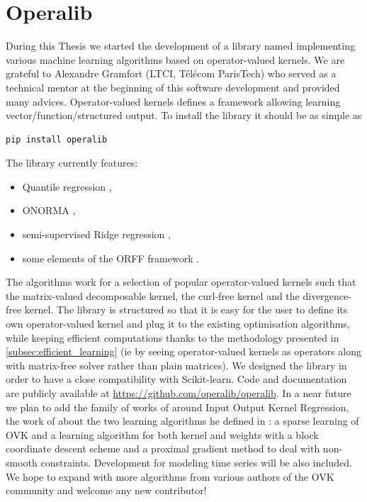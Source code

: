 \section{Operalib}
During this Thesis we started the development of a library named 
implementing various machine learning algorithms based on operator-valued
kernels. We are grateful to Alexandre Gramfort (LTCI, T\'el\'ecom ParisTech)
who served as a technical mentor at the beginning of this software development
and provided many advices.  Operator-valued kernels defines a framework
allowing learning vector/function/structured output. 
To install the library it should be as simple as
\begin{lstlisting}[language=bash,caption={Installation of Operalib.}]
pip install operalib
\end{lstlisting}
The library currently features:
\begin{itemize}
    \item Quantile regression \citep{sangnier2016joint},
    \item \acs{ONORMA} \citep{audiffren2013online},
    \item semi-supervised Ridge regression \citep{Brouard2016_jmlr},
    \item some elements of the \acs{ORFF} framework \citep{brault2016random}.
\end{itemize}
The algorithms work for a selection of popular operator-valued kernels such
that the matrix-valued decomposable kernel, the curl-free kernel and the
divergence-free kernel. The library is structured so that it is easy for the
user to define its own operator-valued kernel and plug it to the existing
optimisation algorithms, while keeping efficient computations thanks to the
methodology presented in \cref{subsec:efficient_learning} (\acs{ie} by seeing
operator-valued kernels as operators along with matrix-free solver rather than
plain matrices). We designed the library in order to have a close compatibility
with Scikit-learn. Code and documentation are publicly available at
\url{https://github.com/operalib/operalib}. In a near future we plan to add the
family of works of \citet{Brouard2016_jmlr} around Input Output Kernel
Regression, the  work of \citet{lim2015operator} about the two learning
algorithms he defined in \citet{lim2015operator} : a sparse learning of OVK and
a learning algorithm for both kernel and weights with a block coordinate
descent scheme and a proximal gradient method to deal with non-smooth
constraints. Development for modeling time series will be also included. We
hope to expand with more algorithms from various authors of the \acs{OVK}
community and welcome any new contributor!

\chapterend

